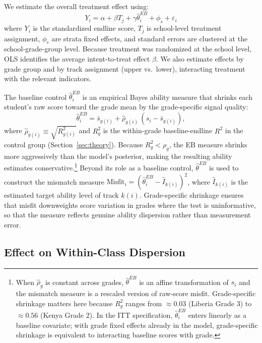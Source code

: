 \documentclass[11pt]{article}
\begin{document}
We estimate the overall treatment effect using:
\begin{equation}
\label{eq:itt}
Y_i = \alpha + \beta T_j + \gamma \hat{\theta}^{EB}_i + \phi_s + \varepsilon_i
\end{equation}
where $Y_i$ is the standardized endline score, $T_j$ is school-level treatment assignment, $\phi_s$ are strata fixed effects, and standard errors are clustered at the school-grade-group level. Because treatment was randomized at the school level, OLS identifies the average intent-to-treat effect $\beta$. We also estimate effects by grade group and by track assignment (upper vs.\ lower), interacting treatment with the relevant indicators.

The baseline control $\hat{\theta}^{EB}_i$ is an empirical Bayes ability measure that shrinks each student's raw score toward the grade mean by the grade-specific signal quality:
\begin{equation}
\label{eq:eb}
\hat{\theta}^{EB}_{i} = \bar{s}_{g(i)} + \hat{\rho}_{g(i)}\,(s_i - \bar{s}_{g(i)}),
\end{equation}
where $\hat{\rho}_{g(i)} \equiv \sqrt{R^2_{g(i)}}$ and $R^2_g$ is the within-grade baseline-endline $R^2$ in the control group (Section~\ref{sec:theory}). Because $R^2_g < \rho_g$, the EB measure shrinks more aggressively than the model's posterior, making the resulting ability estimates conservative.\footnote{When $\hat{\rho}_g$ is constant across grades, $\hat{\theta}^{EB}$ is an affine transformation of $s_i$ and the mismatch measure is a rescaled version of raw-score misfit. Grade-specific shrinkage matters here because $R^2_g$ ranges from $\approx 0.03$ (Liberia Grade 3) to $\approx 0.56$ (Kenya Grade 2). In the ITT specification, $\hat{\theta}^{EB}_i$ enters linearly as a baseline covariate; with grade fixed effects already in the model, grade-specific shrinkage is equivalent to interacting baseline scores with grade.} Beyond its role as a baseline control, $\hat{\theta}^{EB}$ is used to construct the mismatch measure $\text{Misfit}_i = (\hat{\theta}^{EB}_i - \widehat{I}_{k(i)})^2$, where $\widehat{I}_{k(i)}$ is the estimated target ability level of track $k(i)$. Grade-specific shrinkage ensures that misfit downweights score variation in grades where the test is uninformative, so that the measure reflects genuine ability dispersion rather than measurement error.

\subsection{Effect on Within-Class Dispersion}
\end{document}
